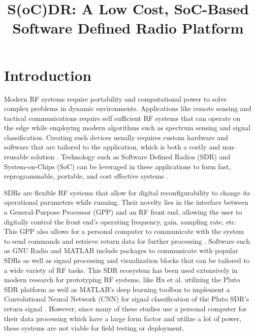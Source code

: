 \documentclass[conference]{IEEEtran}
\begin{document}
\title{S(oC)DR: A Low Cost, SoC-Based Software Defined Radio Platform\\
}

\author{
\and
{}
}

\maketitle

\section{Introduction}
Modern RF systems require portability and computational power to solve complex problems in dynamic environments.
Applications like remote sensing and tactical communications require self sufficient RF systems that can operate on the edge while employing
modern algorithms such as spectrum sensing and signal classification. Creating such devices usually requires
custom hardware and software that are tailored to the application, which is both a costly and non-reusable solution \cite{10880410}. Technology such as
Software Defined Radios (SDR) and System-on-Chips (SoC) can be leveraged in these applications to form fast, reprogrammable, portable, and cost effective systems \cite{9721283}.

SDRs are flexible RF systems that allow for digital reconfigurability to change its operational parameters while running.
Their novelty lies in the interface between a General-Purpose Processor (GPP) and an RF front end, allowing the user to digitally control the front end's
operating frequency, gain, sampling rate, etc. This GPP also allows for a personal computer to communicate with the system to send commands and retrieve return
data for further processing \cite{9721283}. Software such as GNU Radio and MATLAB include packages to communicate with popular SDRs as well as signal processing and visualization
blocks that can be tailored to a wide variety of RF tasks. This SDR ecosystem has been used extensively in modern research for prototyping RF systems,
like Hu et al. utilizing the Pluto SDR platform as well as MATLAB's deep learning toolbox to implement a Convolutional Neural Network (CNN) 
for signal classification of the Pluto SDR's return signal \cite{9687958}. However, since many of these studies use a personal computer for their data processing which have a large form factor 
and utilize a lot of power, these systems are not viable for field testing or deployment. 
\end{document}
